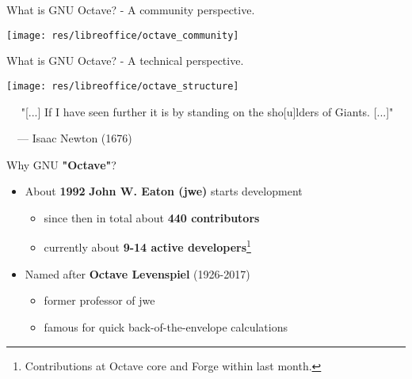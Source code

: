 \begin{frame}{What is GNU Octave? - A community perspective.}
\begin{center}
\texttt{[image: res/libreoffice/octave\_community]}
\end{center}
\end{frame}



\begin{frame}{What is GNU Octave? - A technical perspective.}
\vspace*{-1em}
\begin{center}
\texttt{[image: res/libreoffice/octave\_structure]}
\end{center}
\vspace*{-1em}
\begin{exampleblock}{}
  $\quad$\small
  "[...]
  If I have seen further it is by standing on the sho[u]lders of Giants.
  [...]"
  
  $\quad${\small--- Isaac Newton (1676)}
\end{exampleblock}
\end{frame}



\begin{frame}{Why GNU \textbf{"Octave"}?}

\begin{itemize}
\itemsep2em
\item
About \textbf{1992} \textbf{\color{DarkBlue}John W. Eaton (jwe)}
starts development\\[0.5em]
\begin{itemize}
\itemsep1em
\item
since then in total about \textbf{440 contributors}
\item
currently about \textbf{9-14 active developers}\footnote{Contributions at Octave core and Forge within last month.}
\end{itemize}

\item
Named after \textbf{\color{DarkBlue}Octave Levenspiel} (1926-2017)\\[0.5em]
\begin{itemize}
\itemsep1em
\item
former professor of jwe
\item
famous for quick back-of-the-envelope calculations
\end{itemize}
\end{itemize}
\end{frame}


